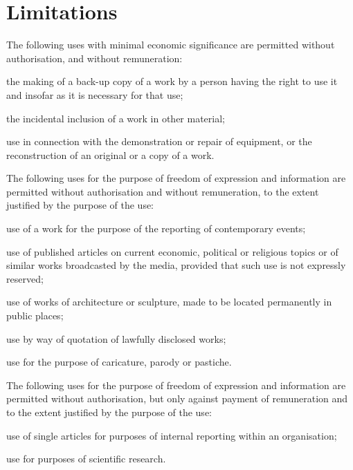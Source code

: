 \section{Limitations}
\begin{contract}

\label{Par:UsesWithMinimalEconomicSignificance}
\Sentence The following uses with minimal economic significance are permitted without
authorisation, and without remuneration:
\begin{legalenum}
	\item the making of a back-up copy of a work by a person having the right to use it
				and insofar as it is necessary for that use;
	\item the incidental inclusion of a work in other material;
	\item use in connection with the demonstration or repair of equipment, or the
				reconstruction of an original or a copy of a work.
\end{legalenum}

\label{Par:UsesForThePurposeOfFreedomOfExpressionAndInformation}
\Sentence The following uses for the purpose of freedom of expression and
information are permitted without authorisation and without
remuneration, to the extent justified by the purpose of the use:
\begin{legalenum}
	\item use of a work for the purpose of the reporting of contemporary events;
	\item use of published articles on current economic, political or religious
				topics or of similar works broadcasted by the media, provided that such
				use is not expressly reserved;
	\item use of works of architecture or sculpture, made to be located
				permanently in public places;
	\item use by way of quotation of lawfully disclosed works;
	\item use for the purpose of caricature, parody or pastiche.
\end{legalenum}

\Sentence  The following uses for the purpose of freedom of expression and \label{Par:UsesForThePurposeOfFreedomOfExpressionAndInformation:par2}
information are permitted without authorisation, but only against
payment of remuneration and to the extent justified by the purpose of the
use:
\begin{legalenum}
	\item use of single articles for purposes of internal reporting within an
				organisation;\samepage
	\item use for purposes of scientific research.
\end{legalenum}


\end{contract}
